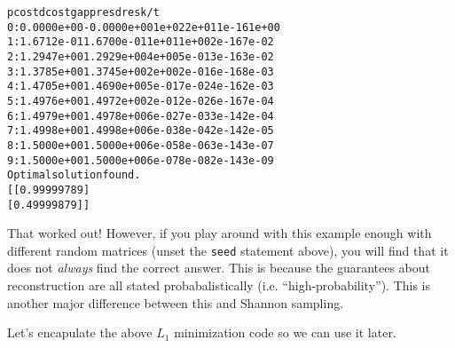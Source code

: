 \documentclass[letterpaper,10pt,english]{/usr/lib/python2.7/site-packages/sphinx/texinputs/sphinxhowto}
\newenvironment{InvisibleVerbatim}
        {\begin{mdframed}[leftmargin=0.1\linewidth,innerleftmargin=3pt,innerrightmargin=3pt, userdefinedwidth=1\linewidth, linewidth=0pt, linecolor=white, usetwoside=false]}
        {\end{mdframed}}
\begin{document}
        

            
                \begin{InvisibleVerbatim}
                \vspace{-0.5\baselineskip}
    \begin{alltt}     pcost       dcost       gap    pres   dres   k/t
 0:  0.0000e+00 -0.0000e+00  1e+02  2e+01  1e-16  1e+00
 1:  1.6712e-01  1.6700e-01  1e+01  1e+00  2e-16  7e-02
 2:  1.2947e+00  1.2929e+00  4e+00  5e-01  3e-16  3e-02
 3:  1.3785e+00  1.3745e+00  2e+00  2e-01  6e-16  8e-03
 4:  1.4705e+00  1.4690e+00  5e-01  7e-02  4e-16  2e-03
 5:  1.4976e+00  1.4972e+00  2e-01  2e-02  6e-16  7e-04
 6:  1.4979e+00  1.4978e+00  6e-02  7e-03  3e-14  2e-04
 7:  1.4998e+00  1.4998e+00  6e-03  8e-04  2e-14  2e-05
 8:  1.5000e+00  1.5000e+00  6e-05  8e-06  3e-14  3e-07
 9:  1.5000e+00  1.5000e+00  6e-07  8e-08  2e-14  3e-09
Optimal solution found.
[[ 0.99999789]
 [ 0.49999879]]
\end{alltt}

            \end{InvisibleVerbatim}
            
        
    
That worked out! However, if you play around with this example enough
with different random matrices (unset the \texttt{seed} statement
above), you will find that it does not \emph{always} find the correct
answer. This is because the guarantees about reconstruction are all
stated probabalistically (i.e. ``high-probability''). This is another
major difference between this and Shannon sampling.

Let's encapulate the above $L_1$ minimization code so we can use it
later.


\end{document}
